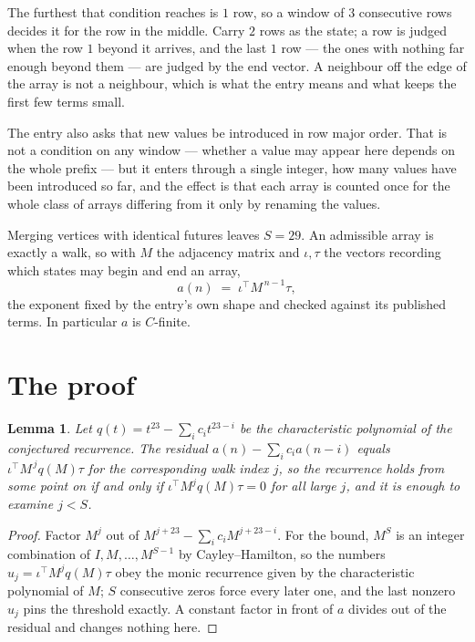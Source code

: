 \documentclass[11pt,a4paper]{article}
\theoremstyle{plain}
\newtheorem{lemma}[theorem]{Lemma}
\theoremstyle{definition}
\begin{document}
The furthest that condition reaches is $1$ row, so a window of $3$ consecutive rows decides it for the row in the middle. Carry $2$ rows as the state; a row is judged when the row $1$ beyond it arrives, and the last $1$ row --- the ones with nothing far enough beyond them --- are judged by the end vector. A neighbour off the edge of the array is not a neighbour, which is what the entry means and what keeps the first few terms small.

The entry also asks that new values be introduced in row major order. That is not a condition on any window --- whether a value may appear here depends on the whole prefix --- but it enters through a single integer, how many values have been introduced so far, and the effect is that each array is counted once for the whole class of arrays differing from it only by renaming the values.

Merging vertices with identical futures leaves $S=29$. An admissible array is exactly a walk, so with $M$ the adjacency matrix and $\iota,\tau$ the vectors recording which states may begin and end an array,
\[
a(n)\;=\;\iota^{\!\top}M^{\,n-1}\tau ,
\]
the exponent fixed by the entry's own shape and checked against its published terms. In
particular $a$ is $C$-finite.

\section{The proof}

\begin{lemma}\label{lem:crit}
Let $q(t)=t^{23}-\sum_i c_it^{23-i}$ be the characteristic polynomial of the
conjectured recurrence. The residual $a(n)-\sum_ic_ia(n-i)$ equals
$\iota^{\!\top}M^{\,j}q(M)\tau$ for the corresponding walk index $j$, so the recurrence
holds from some point on if and only if $\iota^{\!\top}M^{j}q(M)\tau=0$ for all large $j$,
and it is enough to examine $j<S$.
\end{lemma}

\begin{proof}
Factor $M^{j}$ out of $M^{j+23}-\sum_ic_iM^{j+23-i}$. For the bound, $M^{S}$
is an integer combination of $I,M,\dots,M^{S-1}$ by Cayley--Hamilton, so the numbers
$u_j=\iota^{\!\top}M^{j}q(M)\tau$ obey the monic recurrence given by the characteristic
polynomial of $M$; $S$ consecutive zeros force every later one, and the last nonzero $u_j$
pins the threshold exactly. A constant factor in front of $a$ divides out of the residual and
changes nothing here.
\end{proof}
\end{document}
